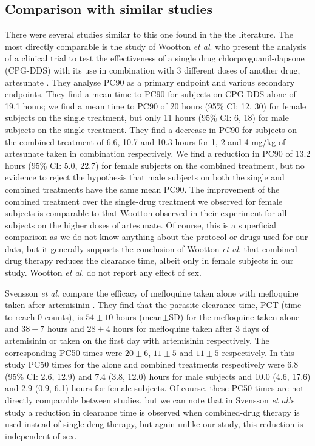 \subsection{Comparison with similar studies}
There were several studies similar to this one found in the the literature. The most directly comparable is the study of Wootton {\it et al}. who present the analysis of a clinical trial to test the effectiveness of a single drug chlorproguanil-dapsone (CPG-DDS) with its use in combination with 3 different doses of another drug, artesunate \cite{wootton}. They analyse PC90 as a primary endpoint and various secondary endpoints. They find a mean time to PC90 for subjects on CPG-DDS alone of 19.1 hours; we find a mean time to PC90 of 20 hours (95\% CI: 12, 30) for female subjects on the single treatment, but only 11 hours (95\% CI: 6, 18) for male subjects on the single treatment. They find a decrease in PC90 for subjects on the combined treatment of 6.6, 10.7 and 10.3 hours for 1, 2 and 4 mg/kg of artesunate taken in combination respectively. We find a reduction in PC90 of 13.2 hours (95\% CI: 5.0, 22.7) for female subjects on the combined treatment, but no evidence to reject the hypothesis that male subjects on both the single and combined treatments have the same mean PC90. The improvement of the combined treatment over the single-drug treatment we observed for female subjects is comparable to that Wootton observed in their experiment for all subjects on the higher doses of artesunate. Of course, this is a superficial comparison as we do not know anything about the protocol or drugs used for our data, but it generally supports the conclusion of Wootton {\it et al}. that combined drug therapy reduces the clearance time, albeit only in female subjects in our study. Wootton {\it et al}. do not report any effect of sex.

Svensson {\it et al}. compare the efficacy of mefloquine taken alone with mefloquine taken after artemisinin \cite{svensson}. They find that the parasite clearance time, PCT (time to reach 0 counts), is $54\pm10$ hours (mean$\pm$SD) for the mefloquine taken alone and $38\pm7$ hours and $28\pm4$ hours for mefloquine taken after 3 days of artemisinin or taken on the first day with artemisinin respectively. The corresponding PC50 times were $20\pm6$, $11\pm5$ and $11\pm5$ respectively. In this study PC50 times for the alone and combined treatments respectively were 6.8 (95\% CI: 2.6, 12.9) and 7.4 (3.8, 12.0) hours for male subjects and 10.0 (4.6, 17.6) and 2.9 (0.9, 6.1) hours for female subjects. Of course, these PC50 times are not directly comparable between studies, but we can note that in Svensson {\it et al}.'s study a reduction in clearance time is observed when combined-drug therapy is used instead of single-drug therapy, but again unlike our study, this reduction is independent of sex.


